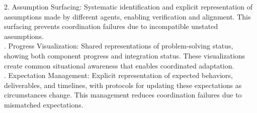 2. Assumption Surfacing: Systematic identification and explicit representation of assumptions made by different agents, enabling verification and alignment. This surfacing prevents coordination failures due to incompatible unstated assumptions.\\ . Progress Visualization: Shared representations of problem-solving status, showing both component progress and integration status. These visualizations create common situational awareness that enables coordinated adaptation.\\ . Expectation Management: Explicit representation of expected behaviors, deliverables, and timelines, with protocols for updating these expectations as circumstances change. This management reduces coordination failures due to mismatched expectations.\\
